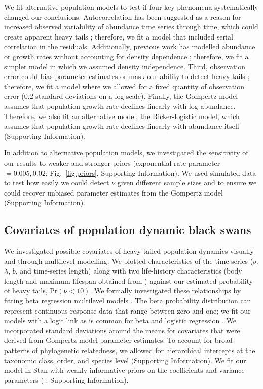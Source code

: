 We fit alternative population models to test if four key phenomena
systematically changed our conclusions. Autocorrelation has been suggested as
a reason for increased observed variability of abundance time series through
time, which could create apparent heavy tails \citep{inchausti2002};
therefore, we fit a model that included serial correlation in the residuals.
Additionally, previous work has modelled abundance or growth rates without
accounting for density dependence \citep{halley2002,segura2013}; therefore, we
fit a simpler model in which we assumed density independence. Third,
observation error could bias parameter estimates \citep{knape2012} or mask our
ability to detect heavy tails \citep{ward2007}; therefore, we fit a model
where we allowed for a fixed quantity of observation error ($0.2$ standard
deviations on a log scale). Finally, the Gompertz model assumes that
population growth rate declines linearly with log abundance. Therefore, we
also fit an alternative model, the Ricker-logistic model, which assumes that
population growth rate declines linearly with abundance itself (Supporting
Information).

In addition to alternative population models, we investigated the sensitivity
of our results to weaker and stronger priors (exponential rate parameter $=
0.005, 0.02$; Fig.~\ref{fig:priors}, Supporting Information). We used
simulated data to test how easily we could detect $\nu$ given different sample
sizes and to ensure we could recover unbiased parameter estimates from the
Gompertz model (Supporting Information).


\subsection{Covariates of population dynamic black swans}

We investigated possible covariates of heavy-tailed population dynamics
visually and through multilevel modelling. We plotted characteristics of the
time series ($\sigma$, $\lambda$, $b$, and time-series length) along with two
life-history characteristics (body length and maximum lifespan obtained from
\citet{brook2006a}) against our estimated probability of heavy tails, Pr$(\nu <
10)$. We formally investigated these relationships by fitting beta
regression multilevel models \citep{ferrari2004}. The beta probability
distribution can represent continuous response data that range between zero
and one; we fit our models with a logit link as is common for beta and logistic
regression \citep{ferrari2004}. We incorporated standard deviations around the
means for covariates that were derived from Gompertz model parameter
estimates. To account for broad patterns of phylogenetic relatedness, we
allowed for hierarchical intercepts at the taxonomic class, order, and species
level (Supporting Information). We fit our model in Stan with weakly
informative priors on the coefficients \citep{gelman2008d} and variance
parameters (\citeauthor{gelman2006c} \citeyear{gelman2006c}
\citeauthor{gelman2014} \citeyear{gelman2014}; Supporting Information).

